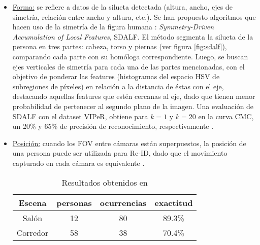 \documentclass[../memoria.tex]{subfiles}
\begin{document}
\begin{itemize}
\begin{itemize}
			\item \underline{Forma:} se refiere a datos de la silueta detectada (altura, ancho, ejes de simetría, relación entre ancho y altura, etc.). Se han propuesto algoritmos que hacen uso de la simetría de la figura humana \cite{farenzena2010person}: \emph{Symmetry-Driven Accumulation of Local Features}, SDALF. El método segmenta la silueta de la persona en tres partes: cabeza, torso y piernas (ver figura \ref{fig:sdalf}), comparando cada parte con su homóloga correspondiente. Luego, se buscan ejes verticales de simetría para cada una de las partes mencionadas, con el objetivo de ponderar las features (histogramas del espacio HSV de subregiones de píxeles) en relación a la distancia de éstas con el eje, destacando aquellas features que estén cercanas al eje, dado que tienen menor probabilidad de pertenecer al segundo plano de la imagen. Una evaluación de SDALF con el dataset VIPeR, obtiene para $k=1$ y $k=20$ en la curva CMC, un 20\% y 65\% de precisión de reconocimiento, respectivamente \cite{farenzena2010person}. %

			
			\item \underline{Posición:} cuando los FOV entre cámaras están superpuestos, la posición de una persona puede ser utilizada para Re-ID, dado que el movimiento capturado en cada cámara es equivalente \cite{khan2003consistent, calderara2008hecol}.
			\begin{table}
			  \begin{center}
			    \begin{tabular}{cccc}
			      \hline
			      Escena    & personas  & ocurrencias & exactitud \\
			      \hline
			      Salón     & 12        & 80          & 89.3\% \\
			      Corredor  & 58        & 38          & 70.4\% \\
			      \hline
			    \end{tabular}  
			  \end{center}
			  \caption{Resultados obtenidos en  \cite{hu2008people}}
			\label{resultados SIFT hu2008}
			\end{table}


\end{itemize}
\end{itemize}
\end{document}

